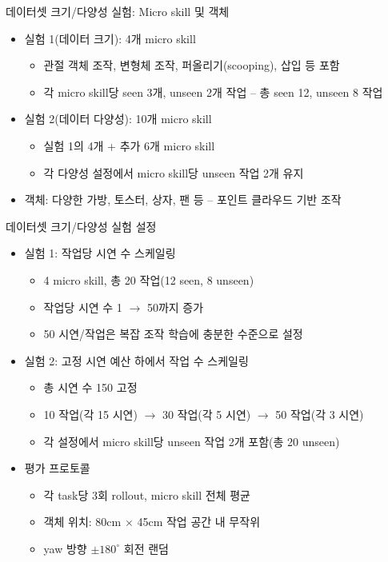 \documentclass[aspectratio=169]{beamer}
\begin{document}
\begin{frame}{데이터셋 크기/다양성 실험: Micro skill 및 객체}
  \small
  \begin{itemize}
    \item 실험 1(데이터 크기): 4개 micro skill
    \begin{itemize}
      \item 관절 객체 조작, 변형체 조작, 퍼올리기(scooping), 삽입 등 포함
      \item 각 micro skill당 seen 3개, unseen 2개 작업 – 총 seen 12, unseen 8 작업
    \end{itemize}
    \item 실험 2(데이터 다양성): 10개 micro skill
    \begin{itemize}
      \item 실험 1의 4개 + 추가 6개 micro skill
      \item 각 다양성 설정에서 micro skill당 unseen 작업 2개 유지
    \end{itemize}
    \item 객체: 다양한 가방, 토스터, 상자, 팬 등 – 포인트 클라우드 기반 조작
  \end{itemize}
\end{frame}

\begin{frame}{데이터셋 크기/다양성 실험 설정}
  \small
  \begin{itemize}
    \item 실험 1: 작업당 시연 수 스케일링
    \begin{itemize}
      \item 4 micro skill, 총 20 작업(12 seen, 8 unseen)
      \item 작업당 시연 수 1 $\rightarrow$ 50까지 증가
      \item 50 시연/작업은 복잡 조작 학습에 충분한 수준으로 설정
    \end{itemize}
    \item 실험 2: 고정 시연 예산 하에서 작업 수 스케일링
    \begin{itemize}
      \item 총 시연 수 150 고정
      \item 10 작업(각 15 시연) $\rightarrow$ 30 작업(각 5 시연) $\rightarrow$ 50 작업(각 3 시연)
      \item 각 설정에서 micro skill당 unseen 작업 2개 포함(총 20 unseen)
    \end{itemize}
    \item 평가 프로토콜
    \begin{itemize}
      \item 각 task당 3회 rollout, micro skill 전체 평균
      \item 객체 위치: 80cm $\times$ 45cm 작업 공간 내 무작위
      \item yaw 방향 $\pm 180^\circ$ 회전 랜덤
    \end{itemize}
  \end{itemize}
\end{frame}
\end{document}
